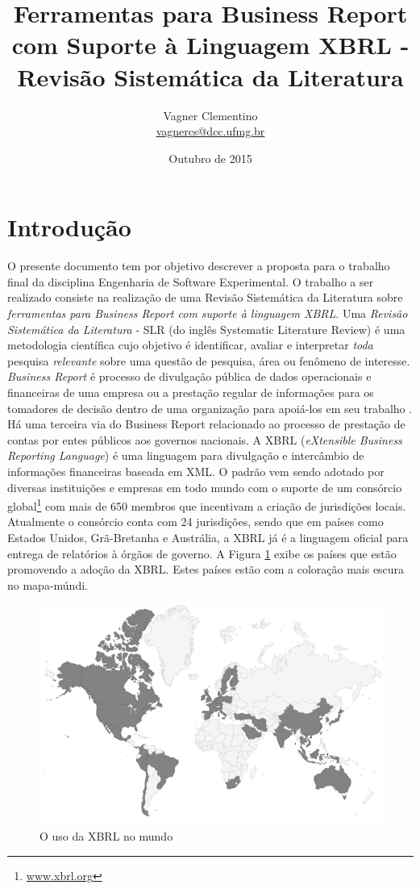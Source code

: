 \documentclass{article}
\title{Ferramentas para Business Report com Suporte à Linguagem XBRL -
  \\Revisão Sistemática da Literatura}
\author{Vagner Clementino \\ 
       \url{vagnercs@dcc.ufmg.br}}
\date{Outubro de  2015}
\begin{document}
\maketitle

\section{Introdução}
\label{sec:intro}

O presente documento tem por objetivo descrever a proposta para o
trabalho final da disciplina Engenharia de Software Experimental. O
trabalho a ser realizado consiste na realização de uma Revisão Sistemática da
Literatura sobre \textit{ferramentas para Business Report com suporte à linguagem XBRL}. Uma \textit{Revisão Sistemática da Literatura} - SLR (do inglês Systematic Literature Review) é uma
metodologia científica cujo objetivo é identificar, avaliar e interpretar
\textit{toda} pesquisa \textit{relevante} sobre uma questão de pesquisa, área ou fenômeno de interesse\cite{keele2007guidelines,wohlin2012experimentation}. \textit{Business Report} é processo de divulgação
pública de dados operacionais e financeiras de uma empresa ou a
prestação regular de informações para os tomadores de decisão dentro
de uma organização para apoiá-los em seu trabalho
\cite{lymer1999business}. Há uma terceira via do Business Report
relacionado ao processo de prestação de contas por entes públicos aos
governos nacionais. A XBRL (\textit{eXtensible Business Reporting
  Language}) é uma linguagem para divulgação e intercâmbio de
informações financeiras baseada em
XML\cite{xbrl_conceitos_aplicacoes}. O padrão vem sendo adotado por
diversas instituições e empresas em todo mundo com o suporte de um
consórcio global\footnote{\url{www.xbrl.org}} com mais de 650 membros
que incentivam a criação de jurisdições locais. Atualmente o consórcio
conta com 24 jurisdições, sendo que em países como  Estados Unidos,
Grã-Bretanha e Austrália, a XBRL já é a linguagem oficial para entrega
de relatórios à órgãos de governo. A Figura \ref{fig:world_map} exibe
os países que estão promovendo a adoção da XBRL. Estes países estão
com a coloração mais escura no mapa-múndi.

\begin{figure}[hbtp]
\centering
\includegraphics[width=.75\textwidth]{../img/world-map.png}
\caption{O uso da XBRL no mundo}
\label{fig:world_map}
\end{figure}
\end{document}

